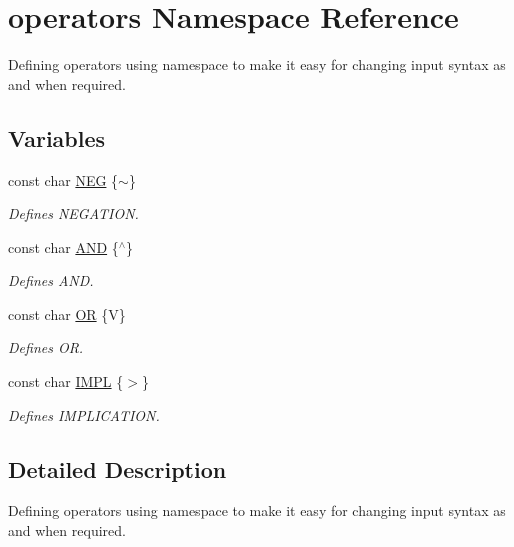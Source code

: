 \hypertarget{namespaceoperators}{}\section{operators Namespace Reference}
\label{namespaceoperators}


Defining operators using namespace to make it easy for changing input syntax as and when required.  


\subsection*{Variables}
\begin{DoxyCompactItemize}
\item 
const char \mbox{\hyperlink{namespaceoperators_abc0d09c09b437de98007962a590ea557}{N\+EG}} \{\textquotesingle{}$\sim$\textquotesingle{}\}
\begin{DoxyCompactList}\small\item\em Defines N\+E\+G\+A\+T\+I\+ON. \end{DoxyCompactList}\item 
const char \mbox{\hyperlink{namespaceoperators_aff9dc11d489d31278c1e3f90ae09dd9b}{A\+ND}} \{\textquotesingle{}$^\wedge$\textquotesingle{}\}
\begin{DoxyCompactList}\small\item\em Defines A\+ND. \end{DoxyCompactList}\item 
const char \mbox{\hyperlink{namespaceoperators_a1f469207e0d08770fc7bbac128cfd845}{OR}} \{\textquotesingle{}V\textquotesingle{}\}
\begin{DoxyCompactList}\small\item\em Defines OR. \end{DoxyCompactList}\item 
const char \mbox{\hyperlink{namespaceoperators_a40fe490f326324304d4529854fb2deea}{I\+M\+PL}} \{\textquotesingle{}$>$\textquotesingle{}\}
\begin{DoxyCompactList}\small\item\em Defines I\+M\+P\+L\+I\+C\+A\+T\+I\+ON. \end{DoxyCompactList}\end{DoxyCompactItemize}


\subsection{Detailed Description}
Defining operators using namespace to make it easy for changing input syntax as and when required. 

